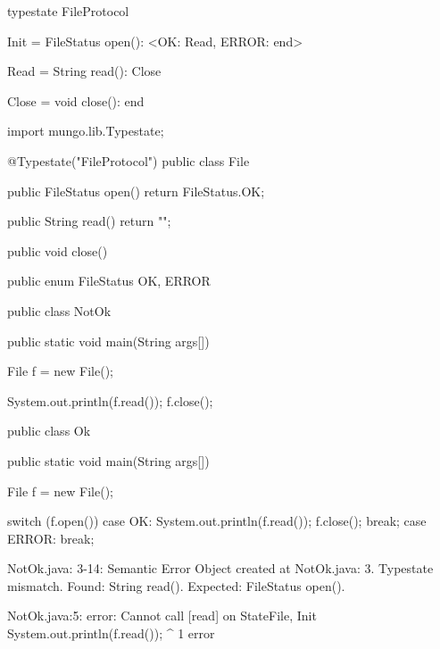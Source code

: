 \begin{code}
typestate FileProtocol {

  Init = {
    FileStatus open(): <OK: Read, ERROR: end>
  }

  Read = {
    String read(): Close
  }

  Close = {
    void close(): end
  }

}\end{code}

\begin{code}
import mungo.lib.Typestate;

@Typestate("FileProtocol")
public class File {

  public FileStatus open() {
    return FileStatus.OK;
  }

  public String read() {
    return "";
  }

  public void close() {

  }

}\end{code}

\begin{code}
public enum FileStatus {
  OK, ERROR
}\end{code}

\begin{code}
public class NotOk {
  public static void main(String args[]) {
    File f = new File();
    
    System.out.println(f.read());
    f.close();
  }
}\end{code}

\begin{code}
public class Ok {
  public static void main(String args[]) {
    File f = new File();

    switch (f.open()) {
      case OK:
        System.out.println(f.read());
        f.close();
        break;
      case ERROR:
        break;
    }
  }
}\end{code}

\lstset{language=,caption=Mungo's output}
\begin{code}

NotOk.java: 3-14: Semantic Error
		Object created at NotOk.java: 3. Typestate mismatch. Found: String read(). Expected: FileStatus open().
\end{code}

\lstset{language=,caption=Our tool's output}
\begin{code}
NotOk.java:5: error: Cannot call [read] on State{File, Init}
    System.out.println(f.read());
                             ^
1 error
\end{code}

